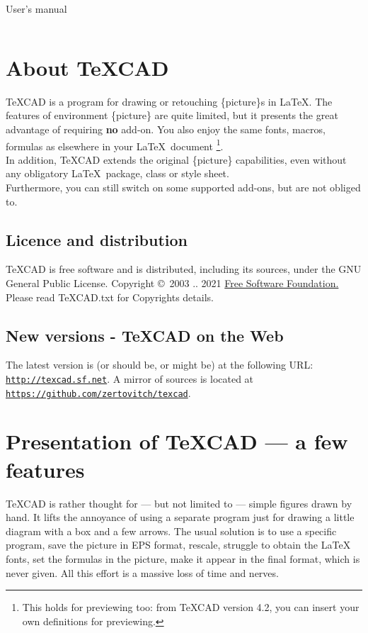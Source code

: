 \documentclass[11pt,a4paper]{article}
\begin{document}
%
\parindent 0pt
%
\def\TC{{\TeX}CAD}
%
\begin{center}
% 
{\sf {\Huge \TC} {\LARGE User's manual}}
\end{center}
%
\def\bs{$\backslash$}
\def\hrefid#1{\href{#1}{{\tt {\small #1}}}}
%
$$ $$
%
\section{About {\TC}}
%
  {\TC} is a program for drawing or retouching \{picture\}s in \LaTeX.
  The features of environment \{picture\} are quite limited, but it
  presents the great advantage of requiring {\bf no} add-on.
  You also enjoy the same fonts, macros, formulas as elsewhere
  in your \LaTeX \, document
  \footnote{This holds for previewing too: from {\TC} version 4.2,
  you can insert your own definitions for previewing.}.
  \\
  In addition, {\TC} extends the original \{picture\} capabilities,
  even without any obligatory \LaTeX \, package, class or style sheet.\\
  Furthermore, you can still switch on some supported add-ons, but are not obliged to.\\

%

\subsection{Licence and distribution}
%
    {\TC} is free software and is distributed, including its sources,
    under the GNU General Public License.
    Copyright \copyright \, 2003 .. 2021
    \href{http://www.fsf.org/}{Free Software Foundation.}
    Please read {\TC}.txt for Copyrights details.
%
\subsection{New versions - {\TC} on the Web}
%
The latest version is (or should be, or might be) at the following URL:
\hrefid{http://texcad.sf.net}.
A mirror of sources is located at \hrefid{https://github.com/zertovitch/texcad}.

\section{Presentation of {{\TC}} --- a few features}
%
{{\TC}} is rather thought for --- but
not limited to --- simple figures drawn by hand.
It lifts the annoyance of using a separate program
just for drawing a little diagram with a box and a few arrows.
The usual solution is
to use a specific program, save the picture in EPS format, rescale,
struggle to obtain
the \LaTeX\, fonts, set the formulas in the picture, make it appear
in the final format, which is never given. All this effort is a
massive loss of time and nerves.
\end{document}
